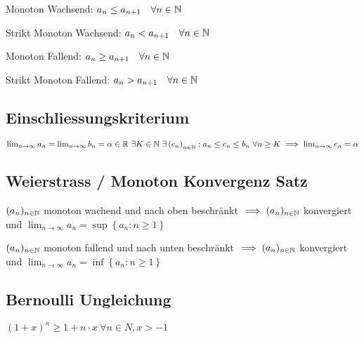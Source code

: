 \begin{compactdesc}
    \item[Monoton Wachsend:] $a_n \le a_{n+1} \quad \forall n \in \mathbb{N}$
    \item[Strikt Monoton Wachsend:] $a_n < a_{n+1} \quad \forall n \in \mathbb{N}$
    \item[Monoton Fallend:] $a_n \ge a_{n+1} \quad \forall n \in \mathbb{N}$
    \item[Strikt Monoton Fallend:] $a_n > a_{n+1} \quad \forall n \in \mathbb{N}$
\end{compactdesc}

\subsection{Einschliessungskriterium}
    $\lim_{n \to \infty} a_n = \lim_{n \to \infty} b_n = \alpha \in \mathbb{R} \ \exists K \in \mathbb{N} \ \exists \left( c_n \right)_{n \in \mathbb{N}}: a_n \le  c_n \le b_n \ \forall n \ge K \implies \lim_{n \to \infty} c_n = \alpha$

\subsection{Weierstrass / Monoton Konvergenz Satz}
\begin{compactitem}
   \item $(a_n)_{n \in \mathbb{N}}$ monoton wachend und nach oben beschränkt $\implies (a_n)_{n \in \mathbb{N}}$ konvergiert und $\lim_{n \to \infty} a_n = \sup \left\{ a_n : n \ge 1 \right\}$
   \item $(a_n)_{n \in \mathbb{N}}$ monoton fallend und nach unten beschränkt $\implies (a_n)_{n \in \mathbb{N}}$ konvergiert und $\lim_{n \to \infty} a_n = \inf \left\{ a_n : n \ge 1 \right\}$
\end{compactitem} 


\subsection{Bernoulli Ungleichung}
$\left( 1 + x \right)^{n} \ge  1 + n \cdot x \ \forall n \in N, x > -1 $

